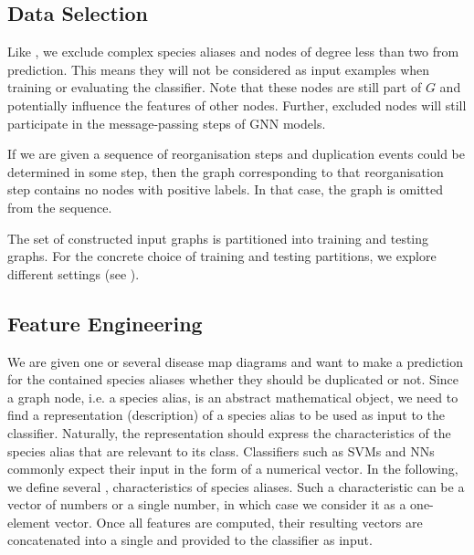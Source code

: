 \documentclass[
	fontsize=10pt, %
	twoside=false, %
	secnumdepth=1, %
  toc=indentunnumbered %
]{kaobook}
\begin{document}
\subsection{Data Selection}


Like \nielsen{}, we exclude complex species aliases and nodes of degree less than
two from prediction. This means they will not be considered as input examples
when training or evaluating the classifier. Note that these nodes are still part
of $G$ and potentially influence the features of other nodes. Further, excluded
nodes will still participate in the message-passing steps of GNN models.

If we are given a sequence of reorganisation steps and duplication events could
be determined in some step, then the graph corresponding to that reorganisation
step contains no nodes with positive labels. In that case, the graph is omitted
from the sequence. 

The set of constructed input graphs is partitioned into training and
testing graphs. For the concrete choice of training and testing partitions, we
explore different settings (see ).




\subsection{Feature Engineering}
\label{sec:feature-selection}

We are given one or several disease map diagrams and want to make a prediction
for the contained species aliases whether they should be duplicated or not.
Since a graph node, i.e. a species alias, is an abstract mathematical object, we
need to find a representation (description) of a species alias to be used as
input to the classifier. Naturally, the representation should express the
characteristics of the species alias that are relevant to its class.
Classifiers such as SVMs and NNs commonly expect their input in the form of a
numerical vector.
%
In the following, we define several , \ie characteristics of
species aliases. Such a characteristic can be a vector of numbers or a single
number, in which case we consider it as a one-element vector. Once all
features are computed, their resulting vectors are concatenated into a
single  and provided to the classifier as input.
\end{document}
